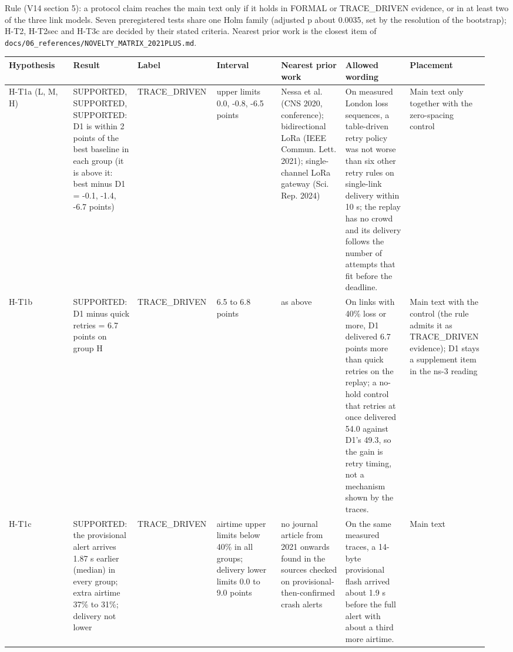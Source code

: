 


Rule (V14 section 5): a protocol claim reaches the main text only if it holds in FORMAL or TRACE\_DRIVEN evidence, or in at least two of the three link models. Seven preregistered tests share one Holm family (adjusted p about 0.0035, set by the resolution of the bootstrap); H-T2, H-T2sec and H-T3c are decided by their stated criteria. Nearest prior work is the closest item of \texttt{docs/06\_references/NOVELTY\_MATRIX\_2021PLUS.md}.

{\scriptsize\raggedright
\begin{longtable}{p{0.136\linewidth}p{0.136\linewidth}p{0.136\linewidth}p{0.136\linewidth}p{0.136\linewidth}p{0.136\linewidth}p{0.136\linewidth}}
\toprule
Hypothesis & Result & Label & Interval & Nearest prior work & Allowed wording & Placement \\
\midrule
\endhead
H-T1a (L, M, H) & SUPPORTED, SUPPORTED, SUPPORTED: D1 is within 2 points of the best baseline in each group (it is above it: best minus D1 = -0.1, -1.4, -6.7 points) & TRACE\_DRIVEN & upper limits 0.0, -0.8, -6.5 points & Nessa et al. (CNS 2020, conference); bidirectional LoRa (IEEE Commun. Lett. 2021); single-channel LoRa gateway (Sci. Rep. 2024) & On measured London loss sequences, a table-driven retry policy was not worse than six other retry rules on single-link delivery within 10 s; the replay has no crowd and its delivery follows the number of attempts that fit before the deadline. & Main text only together with the zero-spacing control \\
H-T1b & SUPPORTED: D1 minus quick retries = 6.7 points on group H & TRACE\_DRIVEN & 6.5 to 6.8 points & as above & On links with 40\% loss or more, D1 delivered 6.7 points more than quick retries on the replay; a no-hold control that retries at once delivered 54.0 against D1's 49.3, so the gain is retry timing, not a mechanism shown by the traces. & Main text with the control (the rule admits it as TRACE\_DRIVEN evidence); D1 stays a supplement item in the ns-3 reading \\
H-T1c & SUPPORTED: the provisional alert arrives 1.87 s earlier (median) in every group; extra airtime 37\% to 31\%; delivery not lower & TRACE\_DRIVEN & airtime upper limits below 40\% in all groups; delivery lower limits 0.0 to 9.0 points & no journal article from 2021 onwards found in the sources checked on provisional-then-confirmed crash alerts & On the same measured traces, a 14-byte provisional flash arrived about 1.9 s before the full alert with about a third more airtime. & Main text \\

\end{longtable}}
